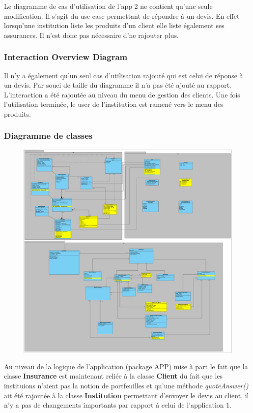 \documentclass[../rapport.tex]{subfiles}
\begin{document}
				Le diagramme de cas d'utilisation de l'app 2 ne contient qu'une seule modification.
				Il s'agit du use case permettant de répondre à un devis. En effet lorsqu'une
				institution liste les produits d'un client elle liste également ses assurances.
				Il n'est donc pas nécessaire d'ne rajouter plus.

		\subsubsection{Interaction Overview Diagram}

		Il n'y a également qu'un seul cas d'utilisation rajouté qui est celui de réponse à un
		devis. Par souci de taille du diagramme il n'a pas été ajouté au rapport. L'interaction
		a été rajoutée au niveau du menu de gestion des clients. Une fois l'utilisation terminée,
		le user de l'institution est ramené vers le menu des produits.

		\subsubsection{Diagramme de classes}

				\begin{figure}[h]
						\centering\includegraphics[scale=0.15]{ressources/photos_diagrammes/extensionThomas/classes2Thomas.jpg}
				\end{figure}
		Au niveau de la logique de l'application (package APP) mise à part le fait que la classe 
		\textbf{Insurance} est maintenant reliée à la classe \textbf{Client} du fait que les 
		instituions n'aient pas la notion de portfeuilles et qu'une méthode \textit{quoteAnswer()}
		ait été rajoutée à la classe \textbf{Institution} permettant d'envoyer le devis au client,
		il n'y a pas de changements importants par rapport à celui de l'application 1. 
\end{document}
